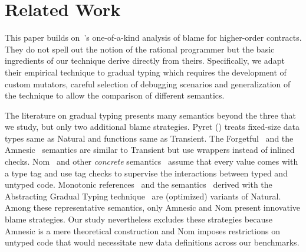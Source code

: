 \section{Related Work}
\label{sec:related}

This paper builds on~\citet{lksfd-popl-2020}'s one-of-a-kind analysis of
blame for higher-order contracts. They do not spell out the notion of the
rational programmer but the basic ingredients of our technique derive
directly from theirs. Specifically, we adapt their empirical technique
to gradual typing which requires the development of custom mutators,
careful selection of debugging scenarios and generalization of the
technique to allow the comparison of different semantics.

The literature on gradual typing presents many semantics beyond the three
that we study, but only two additional blame strategies.
Pyret () treats fixed-size data types same as Natural
and functions same as Transient. The Forgetful~\cite{cl-icfp-2017} and
the Amnesic~\cite{gfd-oopsla-2019} semantics are similar to Transient but
use wrappers instead of inlined checks.  Nom~\cite{mt-oopsla-2017} and
other \emph{concrete\/} semantics~\cite{wnlov-popl-2010, rsfbv-popl-2015,
rzv-ecoop-2015, rat-oopsla-2017} assume that every value comes with a type tag
and use tag checks to supervise the interactions between typed and untyped code.
Monotonic
references~\cite{svctg-esop-2015} and the semantics~\cite{tlt-popl-2019,
etg-icfp-19, tt-scp-20, tgt-popl-18, tt-sas-17} derived with the
Abstracting Gradual Typing
technique~\cite{gct-popl-2016} are (optimized) variants of Natural.
Among these representative semantics, only Amnesic and Nom present innovative
blame strategies.
Our study nevertheless excludes these strategies because Amnesic is a mere
theoretical construction and Nom imposes restrictions on untyped
code that would necessitate new data definitions across our benchmarks.
 
